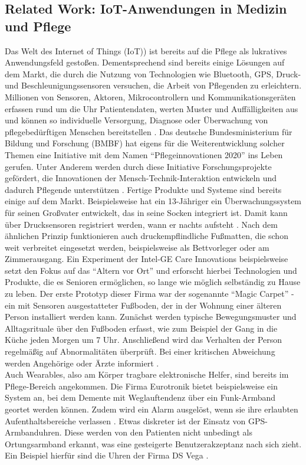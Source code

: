\subsection{Related Work: IoT-Anwendungen in Medizin und Pflege}\label{ssec:rel.work}
Das Welt des Internet of Things (IoT)) ist bereits auf die Pflege als lukratives Anwendungsfeld gestoßen.
 Dementsprechend sind bereits einige Lösungen auf dem Markt, die durch die Nutzung von Technologien wie Bluetooth, GPS, Druck- und Beschleunigungssensoren versuchen, die Arbeit von Pflegenden zu erleichtern. Millionen von Sensoren, Aktoren, Mikrocontrollern und Kommunikationsgeräten erfassen rund um die Uhr Patientendaten, werten Muster und Auffälligkeiten aus und können so individuelle Versorgung, Diagnose oder Überwachung von pflegebedürftigen Menschen bereitstellen \citep[Vgl.][]{digikey}.
Das deutsche Bundesministerium für Bildung und Forschung (BMBF) hat eigens für die Weiterentwicklung solcher Themen eine Initiative mit dem Namen \enquote{Pflegeinnovationen 2020} ins Leben gerufen. Unter Anderem werden durch diese Initiative Forschungsprojekte gefördert, die Innovationen der Mensch-Technik-Interaktion entwickeln und dadurch Pflegende unterstützen \citep[Vgl.][]{bmbf}. Fertige Produkte und Systeme sind bereits einige auf dem Markt.
Beispielsweise hat ein 13-Jähriger ein Überwachungssystem für seinen Großvater entwickelt, das in seine Socken integriert ist. Damit kann über Drucksensoren registriert werden, wann er nachts aufsteht \citep[Vgl.][]{spiegel-alzheimer}. Nach dem ähnlichen Prinzip funktionieren auch druckempflindliche Fußmatten, die schon weit verbreitet eingesetzt werden, beispielsweise als Bettvorleger oder am Zimmerausgang.  Ein Experiment der Intel-GE Care Innovations beispielsweise setzt den Fokus auf das \enquote{Altern vor Ort} und erforscht hierbei Technologien und Produkte, die es Senioren ermöglichen, so lange wie möglich selbständig zu Hause zu leben. Der erste Prototyp dieser Firma war der sogenannte \enquote{Magic Carpet} - ein mit Sensoren ausgestatteter Fußboden, der in der Wohnung einer älteren Person installiert werden kann. Zunächst werden typische Bewegungsmuster und Alltagsrituale über den Fußboden erfasst, wie zum Beispiel der Gang in die Küche jeden Morgen um 7 Uhr. Anschließend wird das Verhalten der Person regelmäßig auf Abnormalitäten überprüft. Bei einer kritischen Abweichung werden Angehörige oder Ärzte informiert \citep[Vgl.][S.49]{bigdata}.\\
Auch Wearables, also am Körper tragbare elektronische Helfer, sind bereits im Pflege-Bereich angekommen. Die Firma Eurotronik bietet beispielsweise ein System an, bei dem Demente mit Weglauftendenz über ein Funk-Armband geortet werden können. Zudem wird ein Alarm ausgelöst, wenn sie ihre erlaubten Aufenthaltsbereiche verlassen \citep[Vgl.][]{eurotronik}. Etwas diskreter ist der Einsatz von GPS-Armbanduhren. Diese werden von den Patienten nicht unbedingt als Ortungsarmband erkannt, was eine gesteigerte Benutzerakzeptanz nach sich zieht. Ein Beispiel hierfür sind die Uhren der Firma DS Vega \citep[Vgl.][]{ds-vega}.
